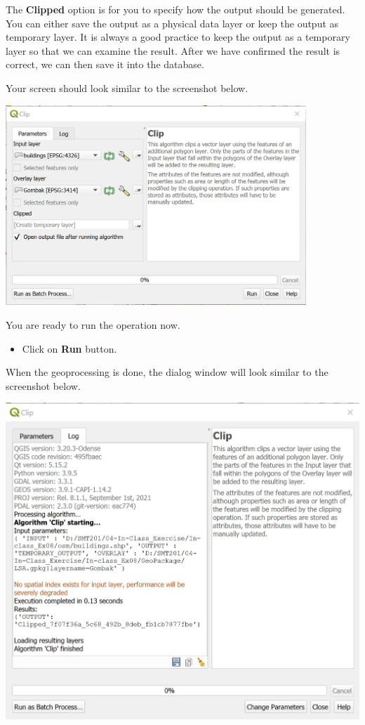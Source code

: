 \documentclass[
  letterpaper,
  DIV=11,
  numbers=noendperiod]{scrreprt}
\providecommand{\tightlist}{%
  \setlength{\itemsep}{0pt}\setlength{\parskip}{0pt}}\usepackage{longtable,booktabs,array}
\begin{document}
The \textbf{Clipped} option is for you to specify how the output should
be generated. You can either save the output as a physical data layer or
keep the output as temporary layer. It is always a good practice to keep
the output as a temporary layer so that we can examine the result. After
we have confirmed the result is correct, we can then save it into the
database.

Your screen should look similar to the screenshot below.

\includegraphics[width=0.85\textwidth,height=\textheight]{./img07/image15.jpg}

You are ready to run the operation now.

\begin{itemize}
\tightlist
\item
  Click on \textbf{Run} button.
\end{itemize}

When the geoprocessing is done, the dialog window will look similar to
the screenshot below.

\includegraphics{./img07/image16.jpg}
\end{document}
